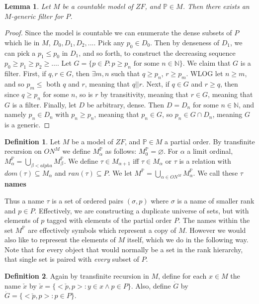 \documentclass{article}
\theoremstyle{definition}
\newtheorem{definition}{Definition}[section]
\theoremstyle{plain}
\theoremstyle{theorem}
\newtheorem{lemma}{Lemma}[section]
\begin{document}
\begin{lemma}
	Let $M$ be a countable model of $ZF$, and $\mathbb{P} \in M$. Then there exists an $M$-generic filter for $P$.
\end{lemma}
\begin{proof}
	Since the model is countable we can enumerate the dense subsets of $P$ which lie in $M$, $D_0,D_1,D_2,...$. Pick any $p_0 \in D_0$. Then by denseness of $D_1$, we can pick a $p_1 \leq p_0$ in $D_1$, and so forth, to construct the decreasing sequence $p_0 \geq p_1 \geq p_2 \geq \ldots$. Let $G = \{p \in P: p \geq p_n \textrm{ for some }n \in \mathbb{N}\}$. We claim that $G$ is a filter. First, if $q,r \in G$, then $\exists m,n$ such that $q \geq p_n$, $r \geq p_m$. WLOG let $n\geq m$, and so $p_m \leq$ both $q$ and $r$, meaning that $q||r$. Next, if $q \in G$ and $r \geq q$, then since $q \geq p_n$ for some $n$, so is $r$ by transitivity, meaning that $r \in G$, meaning that $G$ is a filter. Finally, let $D$ be arbitrary, dense. Then $D = D_n$ for some $n \in \mathbb{N}$, and namely $p_n \in D_n$ with $p_n \geq p_n$, meaning that $p_n \in G$, so $p_n \in G \cap D_n$, meaning $G$ is a generic.
\end{proof}
\begin{definition}
	Let $M$ be a model of $ZF$, and $\mathbb{P} \in M$ a partial order. By transfinite recursion on $ON^M$ we define $M_{\alpha}^{\mathbb{P}}$ as follows: $M_0^{\mathbb{P}} = \varnothing$. For $\alpha$ a limit ordinal, $M_{\alpha}^{\mathbb{P}} = \bigcup_{\beta < alpha}M_{\beta}^{\mathbb{P}}$. We define $\tau \in M_{\alpha+1}$ iff $\tau \in M_{\alpha}$ or $\tau$ is a relation with $dom(\tau) \subseteq M_{\alpha}$ and $ran(\tau) \subseteq P$. We let $M^{\mathbb{P}} = \bigcup_{\alpha \in ON^M}M_{\alpha}^{\mathbb{P}}$. We call these $\tau$ \textbf{names}
\end{definition}
Thus a name $\tau$ is a set of ordered pairs $(\sigma,p)$ where $\sigma$ is a name of smaller rank and $p \in P$. Effectively, we are constructing a duplicate universe of sets, but with elements of $p$ tagged with elements of the partial order $P$. The names within the set $M^{\mathbb{P}}$ are effectively symbols which represent a copy of $M$. However we would also like to represent the elements of $M$ itself, which we do in the following way. Note that for every object that would normally be a set in the rank hierarchy, that single set is paired with \textit{every} subset of $P$. 
\begin{definition}
	Again by transfinite recursion in $M$, define for each $x \in M$ the name $\check{x}$ by $\check{x} = \{<\check{p},p>: y \in x \wedge p \in P\}$. Also, define $\dot{G}$ by $\dot{G} = \{<\check{p},p>: p \in P \}$.  
\end{definition}
\end{document}
